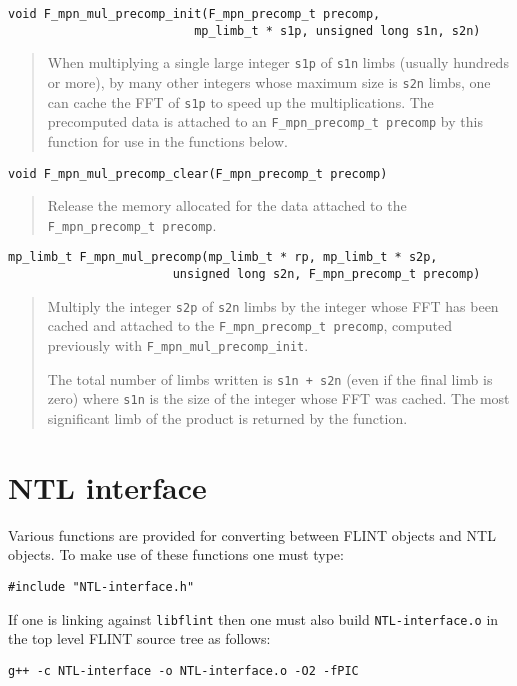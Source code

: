\documentclass[a4paper,10pt]{article}
\newcommand{\code}{\lstinline}
\begin{document}
\begin{lstlisting}
void F_mpn_mul_precomp_init(F_mpn_precomp_t precomp, 
                          mp_limb_t * s1p, unsigned long s1n, s2n)
\end{lstlisting}
\begin{quote}
When multiplying a single large integer \code{s1p} of \code{s1n} limbs (usually hundreds or more), by many other integers whose maximum size is \code{s2n} limbs, one can cache the FFT of \code{s1p} to speed up the multiplications. The precomputed data is attached to an \code{F_mpn_precomp_t precomp} by this function for use in the functions below.
\end{quote}

\begin{lstlisting}
void F_mpn_mul_precomp_clear(F_mpn_precomp_t precomp)
\end{lstlisting}
\begin{quote}
Release the memory allocated for the data attached to the \code{F_mpn_precomp_t precomp}.
\end{quote}

\begin{lstlisting}
mp_limb_t F_mpn_mul_precomp(mp_limb_t * rp, mp_limb_t * s2p, 
                       unsigned long s2n, F_mpn_precomp_t precomp)
\end{lstlisting}
\begin{quote}
Multiply the integer \code{s2p} of \code{s2n} limbs by the integer whose FFT has been cached and attached to the \code{F_mpn_precomp_t precomp}, computed previously with \code{F_mpn_mul_precomp_init}. 

The total number of limbs written is \code{s1n + s2n} (even if the final limb is zero) where \code{s1n} is the size of the integer whose FFT was cached. The most significant limb of the product is returned by the function.
\end{quote}
                      
\section{NTL interface}
Various functions are provided for converting between FLINT objects and NTL objects. To make use of these functions one must type:

\code{#include "NTL-interface.h"}

If one is linking against \code{libflint} then one must also build \code{NTL-interface.o} in the top level FLINT source tree as follows:
\begin{lstlisting}
g++ -c NTL-interface -o NTL-interface.o -O2 -fPIC
\end{lstlisting}
\end{document}

